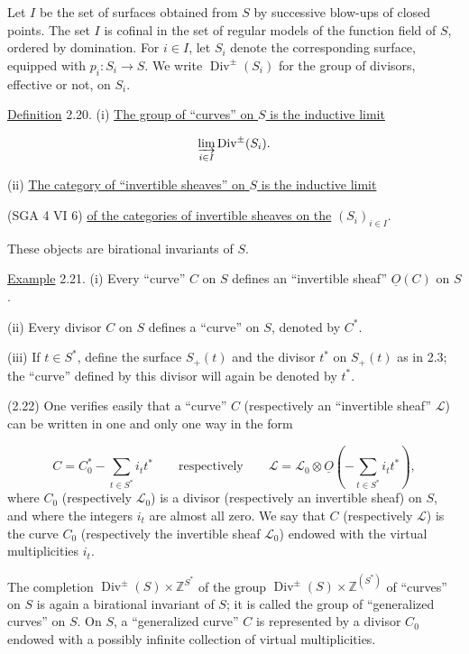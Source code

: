 Let $I$ be the set of surfaces obtained from $S$ by successive blow-ups of
closed points.  The set $I$ is cofinal in the set of regular models of the
function field of $S$, ordered by domination.  For $i\in I$, let $S_i$ denote
the corresponding surface, equipped with $p_i:S_i\longrightarrow S$.  We write
$\operatorname{Div}^{\pm}(S_i)$ for the group of divisors, effective or not, on
$S_i$.

\underline{Definition} 2.20. (i) \underline{The group of ``curves'' on $S$ is
the inductive limit}

\begin{equation*}
\varinjlim_{i\in I}\operatorname{Div}^{\pm}(S_i).
\end{equation*}

(ii) \underline{The category of ``invertible sheaves'' on $S$ is the inductive
limit}


(SGA 4 VI 6) \underline{of the categories of invertible sheaves on the}
$(S_i)_{i\in I}$.

These objects are birational invariants of $S$.

\underline{Example} 2.21. (i) Every ``curve'' $C$ on $S$ defines an
``invertible sheaf'' $\underline{O}(C)$ on $S$.

(ii) Every divisor $C$ on $S$ defines a ``curve'' on $S$, denoted by $C^*$.

(iii) If $t\in S^*$, define the surface $S_+(t)$ and the divisor $t^*$ on
$S_+(t)$ as in 2.3; the ``curve'' defined by this divisor will again be denoted
by $t^*$.

(2.22) One verifies easily that a ``curve'' $C$ (respectively an ``invertible
sheaf'' $\mathcal L$) can be written in one and only one way in the form

\begin{equation*}
C=C_0^*-\sum_{t\in S^*}i_t t^*
\qquad\text{respectively}\qquad
\mathcal L=\mathcal L_0\otimes\underline{O}
\left(-\sum_{t\in S^*}i_t t^*\right),
\end{equation*}
where $C_0$ (respectively $\mathcal L_0$) is a divisor (respectively an
invertible sheaf) on $S$, and where the integers $i_t$ are almost all zero.  We
say that $C$ (respectively $\mathcal L$) is the curve $C_0$ (respectively the
invertible sheaf $\mathcal L_0$) endowed with the virtual multiplicities $i_t$.

The completion
$\operatorname{Div}^{\pm}(S)\times\mathbb Z^{S^*}$ of the group
$\operatorname{Div}^{\pm}(S)\times\mathbb Z^{(S^*)}$ of ``curves'' on $S$ is
again a birational invariant of $S$; it is called the group of ``generalized
curves'' on $S$.  On $S$, a ``generalized curve'' $C$ is represented by a
divisor $C_0$ endowed with a possibly infinite collection of virtual
multiplicities.

